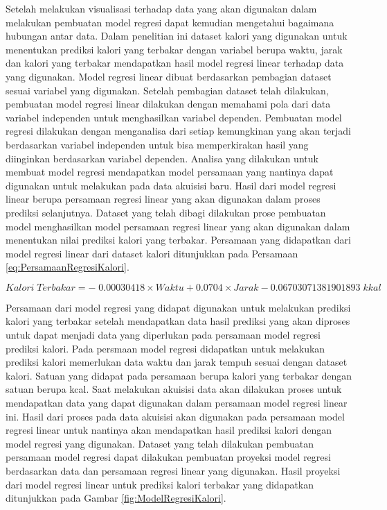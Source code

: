 Setelah melakukan visualisasi terhadap data yang akan digunakan dalam melakukan pembuatan model regresi dapat kemudian mengetahui bagaimana hubungan antar data. Dalam penelitian ini dataset kalori yang digunakan untuk menentukan prediksi kalori yang terbakar dengan variabel berupa waktu, jarak dan kalori yang terbakar mendapatkan hasil model regresi linear terhadap data yang digunakan. Model regresi linear dibuat berdasarkan pembagian dataset sesuai variabel yang digunakan. Setelah pembagian dataset telah dilakukan, pembuatan model regresi linear dilakukan dengan memahami pola dari data variabel independen untuk menghasilkan variabel dependen. Pembuatan model regresi dilakukan dengan menganalisa dari setiap kemungkinan yang akan terjadi berdasarkan variabel independen untuk bisa memperkirakan hasil yang diinginkan berdasarkan variabel dependen. Analisa yang dilakukan untuk membuat model regresi mendapatkan model persamaan yang nantinya dapat digunakan untuk melakukan pada data akuisisi baru. Hasil dari model regresi linear berupa persamaan regresi linear yang akan digunakan dalam proses prediksi selanjutnya. Dataset yang telah dibagi dilakukan prose pembuatan model menghasilkan model persamaan regresi linear yang akan digunakan dalam menentukan nilai prediksi kalori yang terbakar. Persamaan yang didapatkan dari model regresi linear dari dataset kalori ditunjukkan pada Persamaan \ref{eq:PersamaanRegresiKalori}.

\begin{equation}
  \label{eq:PersamaanRegresiKalori}
  Kalori \; Terbakar = - \; 0.00030418 \times Waktu + 0.0704 \times Jarak - 0.06703071381901893 \; kkal
\end{equation}

Persamaan dari model regresi yang didapat digunakan untuk melakukan prediksi kalori yang terbakar setelah mendapatkan data hasil prediksi yang akan diproses untuk dapat menjadi data yang diperlukan pada persamaan model regresi prediksi kalori. Pada persmaan model regresi didapatkan untuk melakukan prediksi kalori memerlukan data waktu dan jarak tempuh sesuai dengan dataset kalori. Satuan yang didapat pada persamaan berupa kalori yang terbakar dengan satuan berupa kcal. Saat melakukan akuisisi data akan dilakukan proses untuk mendapatkan data yang dapat digunakan dalam persamaan model regresi linear ini. Hasil dari proses pada data akuisisi akan digunakan pada persamaan model regresi linear untuk nantinya akan mendapatkan hasil prediksi kalori dengan model regresi yang digunakan. Dataset yang telah dilakukan pembuatan persamaan model regresi dapat dilakukan pembuatan proyeksi model regresi berdasarkan data dan persamaan regresi linear yang digunakan. Hasil proyeksi dari model regresi linear untuk prediksi kalori terbakar yang didapatkan ditunjukkan pada Gambar \ref{fig:ModelRegresiKalori}.

